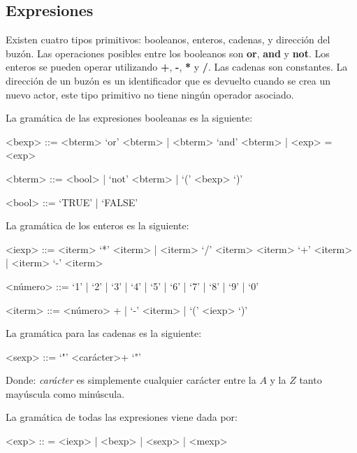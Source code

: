 \subsection{Expresiones}\label{actores:exp}
Existen cuatro tipos primitivos: booleanos, enteros, cadenas, y dirección del buzón. Las operaciones posibles entre los booleanos son \textbf{or}, \textbf{and} y \textbf{not}. Los enteros se pueden operar utilizando \textbf{+}, \textbf{-}, \textbf{*} y \textbf{/}. Las cadenas son constantes. La dirección de un buzón es un identificador que es devuelto cuando se crea un nuevo actor, este tipo primitivo no tiene ningún operador asociado.

La gramática de las expresiones booleanas es la siguiente:

\begin{grammar}

<bexp> ::= <bterm> `or' <bterm> | <bterm> `and' <bterm> | <exp> = <exp>
  
<bterm> ::= <bool> | `not' <bterm> | `(' <bexp> `)' 

<bool> ::= `TRUE' | `FALSE'

\end{grammar}

La gramática de los enteros es la siguiente:

\begin{grammar}

<iexp> ::= <iterm> `*' <iterm> | <iterm> `/' <iterm> 
\alt <iterm> `+' <iterm>  | <iterm> `-' <iterm>

<número> ::= `1' | `2' | `3' | `4' | `5' | `6' | `7' | `8' | `9' | `0'

<iterm> ::= <número> + | `-' <iterm> | `(' <iexp> `)'

\end{grammar}

La gramática para las cadenas es la siguiente:

\begin{grammar}
 <sexp> ::= `"' <carácter>+ `"'
\end{grammar}

Donde: \textit{carácter} es simplemente cualquier carácter entre la $A$ y la $Z$ tanto mayúscula como minúscula.

La gramática de todas las expresiones viene dada por:

\begin{grammar}
<exp> :: = <iexp> | <bexp> | <sexp> | <mexp>  
\end{grammar}

